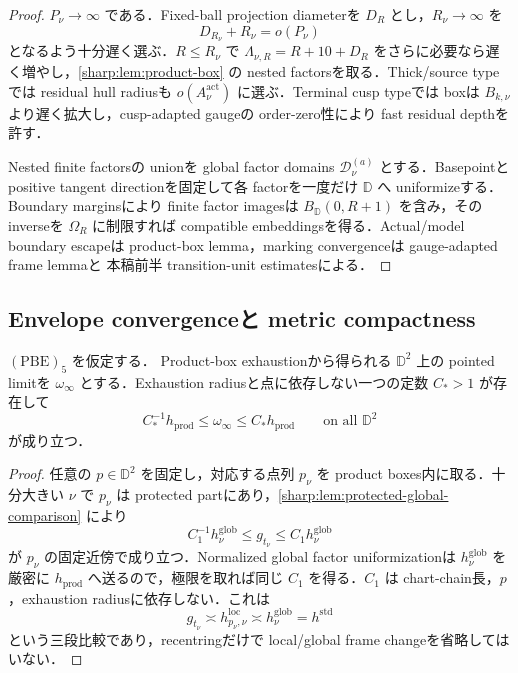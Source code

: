 \documentclass[a4paper,11pt]{ltjsarticle}
\numberwithin{equation}{section}
\theoremstyle{plain}
\theoremstyle{definition}
\theoremstyle{remark}
\begin{document}
\begin{proof}
$P_\nu\to\infty$ である．Fixed-ball projection diameterを $D_R$ とし，$R_\nu\to\infty$ を
\[
 D_{R_\nu}+R_\nu=o(P_\nu)
\]
となるよう十分遅く選ぶ．$R\le R_\nu$ で $\Lambda_{\nu,R}=R+10+D_R$ をさらに必要なら遅く増やし，\cref{sharp:lem:product-box} の nested factorsを取る．Thick/source typeでは residual hull radiusも $o(A_\nu^{\mathrm{act}})$ に選ぶ．Terminal cusp typeでは boxは $B_{k,\nu}$ より遅く拡大し，cusp-adapted gaugeの order-zero性により fast residual depthを許す．

Nested finite factorsの unionを global factor domains $\mathscr D_\nu^{(a)}$ とする．Basepointと positive tangent directionを固定して各 factorを一度だけ $\mathbb D$ へ uniformizeする．Boundary marginsにより finite factor imagesは $B_{\mathbb D}(0,R+1)$ を含み，その inverseを $\Omega_R$ に制限すれば compatible embeddingsを得る．Actual/model boundary escapeは product-box lemma，marking convergenceは gauge-adapted frame lemmaと 本稿前半 transition-unit estimatesによる．
\end{proof}

\subsection{Envelope convergenceと metric compactness}

\begin{lemma}\label{sharp:lem:global-comparison-recentering}
$\mathrm{(PBE)}_5$ を仮定する．
Product-box exhaustionから得られる $\mathbb D^2$ 上の pointed limitを $\omega_\infty$ とする．Exhaustion radiusと点に依存しない一つの定数 $C_*>1$ が存在して
\[
 C_*^{-1}h_{\mathrm{prod}}\le \omega_\infty\le C_*h_{\mathrm{prod}}
 \qquad\text{on all }\mathbb D^2
\]
が成り立つ．
\end{lemma}

\begin{proof}
任意の $p\in\mathbb D^2$ を固定し，対応する点列 $p_\nu$ を product boxes内に取る．十分大きい $\nu$ で $p_\nu$ は protected partにあり，\cref{sharp:lem:protected-global-comparison} により
\[
 C_1^{-1}h^{\mathrm{glob}}_\nu\le g_{t_\nu}\le C_1h^{\mathrm{glob}}_\nu
\]
が $p_\nu$ の固定近傍で成り立つ．Normalized global factor uniformizationは $h^{\mathrm{glob}}_\nu$ を厳密に $h_{\mathrm{prod}}$ へ送るので，極限を取れば同じ $C_1$ を得る．$C_1$ は chart-chain長，$p$，exhaustion radiusに依存しない．これは
\[
 g_{t_\nu}\asymp h^{\mathrm{loc}}_{p_\nu,\nu}
 \asymp h^{\mathrm{glob}}_\nu
 =h^{\mathrm{std}}
\]
という三段比較であり，recentringだけで local/global frame changeを省略してはいない．
\end{proof}
\end{document}
